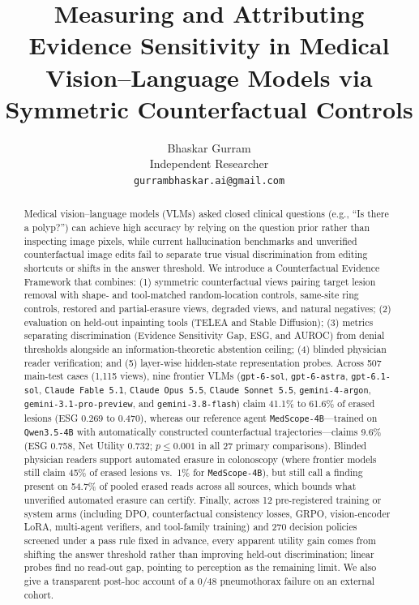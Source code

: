 \documentclass{article} %
\title{Measuring and Attributing Evidence Sensitivity in Medical Vision--Language Models via Symmetric Counterfactual Controls}
\author{Bhaskar Gurram\\
Independent Researcher\\
\texttt{gurrambhaskar.ai@gmail.com}
}
\begin{document}
\maketitle

\begin{abstract}
Medical vision--language models (VLMs) asked closed clinical questions (e.g., ``Is there a polyp?'') can achieve high accuracy by relying on the question prior rather than inspecting image pixels, while current hallucination benchmarks and unverified counterfactual image edits fail to separate true visual discrimination from editing shortcuts or shifts in the answer threshold. We introduce a Counterfactual Evidence Framework that combines: (1) symmetric counterfactual views pairing target lesion removal with shape- and tool-matched random-location controls, same-site ring controls, restored and partial-erasure views, degraded views, and natural negatives; (2) evaluation on held-out inpainting tools (TELEA and Stable Diffusion); (3) metrics separating discrimination (Evidence Sensitivity Gap, ESG, and AUROC) from denial thresholds alongside an information-theoretic abstention ceiling; (4) blinded physician reader verification; and (5) layer-wise hidden-state representation probes. Across 507 main-test cases (1,115 views), nine frontier VLMs (\texttt{gpt-6-sol}, \texttt{gpt-6-astra}, \texttt{gpt-6.1-sol}, \texttt{Claude Fable 5.1}, \texttt{Claude Opus 5.5}, \texttt{Claude Sonnet 5.5}, \texttt{gemini-4-argon}, \texttt{gemini-3.1-pro-preview}, and \texttt{gemini-3.8-flash}) claim 41.1\% to 61.6\% of erased lesions (ESG 0.269 to 0.470), whereas our reference agent \texttt{MedScope-4B}---trained on \texttt{Qwen3.5-4B} with automatically constructed counterfactual trajectories---claims 9.6\% (ESG 0.758, Net Utility 0.732; $p \le 0.001$ in all 27 primary comparisons). Blinded physician readers support automated erasure in colonoscopy (where frontier models still claim 45\% of erased lesions vs.\ 1\% for \texttt{MedScope-4B}), but still call a finding present on 54.7\% of pooled erased reads across all sources, which bounds what unverified automated erasure can certify. Finally, across 12 pre-registered training or system arms (including DPO, counterfactual consistency losses, GRPO, vision-encoder LoRA, multi-agent verifiers, and tool-family training) and 270 decision policies screened under a pass rule fixed in advance, every apparent utility gain comes from shifting the answer threshold rather than improving held-out discrimination; linear probes find no read-out gap, pointing to perception as the remaining limit. We also give a transparent post-hoc account of a 0/48 pneumothorax failure on an external cohort.
\end{abstract}
\end{document}

